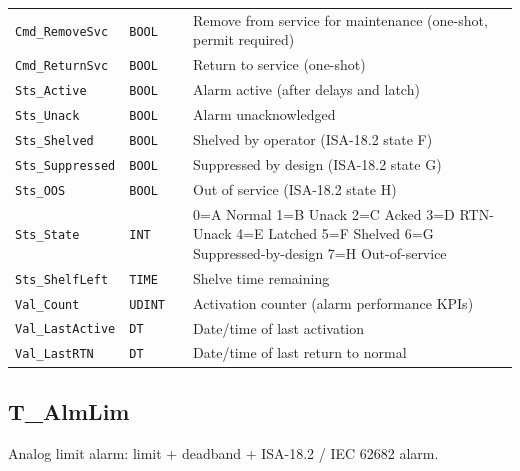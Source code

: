 \begin{small}
\begin{longtable}{@{}P{3.70cm}P{2.20cm}P{1.70cm}P{8.91cm}@{}}
\texttt{Cmd\_RemoveSvc} & \texttt{BOOL} &  & Remove from service for maintenance (one-shot, permit required) \\
\texttt{Cmd\_ReturnSvc} & \texttt{BOOL} &  & Return to service (one-shot) \\
\texttt{Sts\_Active} & \texttt{BOOL} &  & Alarm active (after delays and latch) \\
\texttt{Sts\_Unack} & \texttt{BOOL} &  & Alarm unacknowledged \\
\texttt{Sts\_Shelved} & \texttt{BOOL} &  & Shelved by operator (ISA-18.2 state F) \\
\texttt{Sts\_Suppressed} & \texttt{BOOL} &  & Suppressed by design (ISA-18.2 state G) \\
\texttt{Sts\_OOS} & \texttt{BOOL} &  & Out of service (ISA-18.2 state H) \\
\texttt{Sts\_State} & \texttt{INT} &  & 0=A Normal 1=B Unack 2=C Acked 3=D RTN-Unack 4=E Latched 5=F Shelved 6=G Suppressed-by-design 7=H Out-of-service \\
\texttt{Sts\_ShelfLeft} & \texttt{TIME} &  & Shelve time remaining \\
\texttt{Val\_Count} & \texttt{UDINT} &  & Activation counter (alarm performance KPIs) \\
\texttt{Val\_LastActive} & \texttt{DT} &  & Date/\allowbreak{}time of last activation \\
\texttt{Val\_LastRTN} & \texttt{DT} &  & Date/\allowbreak{}time of last return to normal \\
\bottomrule
\end{longtable}
\end{small}

\subsection{T\_AlmLim}\label{sec:pclib-t-almlim}

Analog limit alarm: limit + deadband + ISA-18.2 /\allowbreak{} IEC 62682 alarm.

\par{}\par

